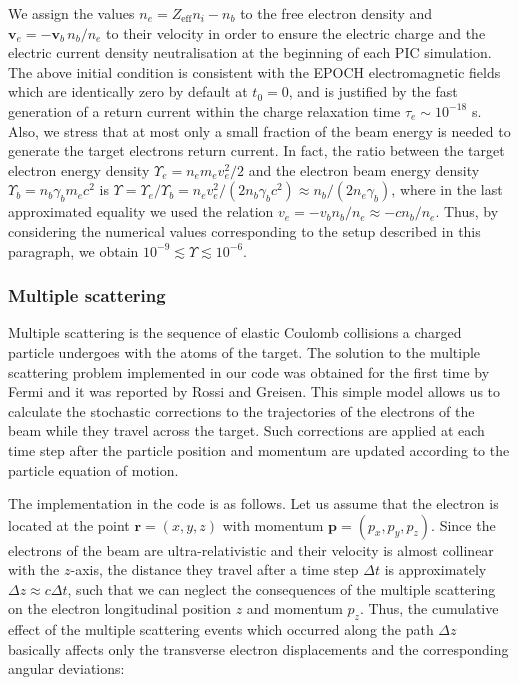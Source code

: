 \documentclass[fleqn,11pt]{wlscirep}
\begin{document}
We assign the values $n_e=Z_\text{eff}n_i-n_b$ to the free electron density and $\boldsymbol{v}_e=-\boldsymbol{v}_b\,n_b/n_e$ to their velocity in order to ensure the electric charge and the electric current density neutralisation at the beginning of each PIC simulation.  
The above initial condition is consistent with the EPOCH electromagnetic fields which are identically zero by default at $t_0=0$, and is justified by the fast generation of a return current within the charge relaxation time\cite{MillerChargedBeams,2001PhPl....8.1441F} $\tau_e\sim10^{-18}$ s. 
Also, we stress that at most only a small fraction of the beam energy is needed to generate the target electrons return current. In fact, the ratio between the target electron energy density $\Upsilon_e=n_em_ev_e^2/2$ and the electron beam energy density $\Upsilon_b=n_b\gamma_bm_ec^2$ is $\Upsilon=\Upsilon_e/\Upsilon_b=n_ev_e^2/(2n_b\gamma_bc^2)\approx n_b/(2n_e\gamma_b)$, where in the last approximated equality we used the relation $v_e=-v_bn_b/n_e\approx-cn_b/n_e$. 
Thus, by considering the numerical values corresponding to the setup described in this paragraph, we obtain $10^{-9}\lesssim\Upsilon\lesssim10^{-6}$.

\subsubsection*{Multiple scattering}

Multiple scattering\cite{Moliere:1948zz,PhysRev.89.1256} is the sequence of elastic Coulomb collisions a charged particle undergoes with the atoms of the target. 
The solution to the multiple scattering problem implemented in our code was obtained for the first time by Fermi and it was reported by Rossi and Greisen\cite{RevModPhys.13.240}. 
This simple model allows us to calculate the stochastic corrections to the trajectories of the electrons of the beam while they travel across the target. 
Such corrections are applied at each time step after the particle position and momentum are updated according to the particle equation of motion. 

The implementation in the code is as follows. Let us assume that the electron is located at the point $\boldsymbol{r}=(x,y,z)$ with momentum $\boldsymbol{p}=(p_{x},p_{y},p_{z})$. Since the electrons of the beam are ultra-relativistic and their velocity is almost collinear with the $z$-axis, the distance they travel after a time step $\Delta t$ is approximately $\Delta z\approx c\Delta t$, such that we can neglect the consequences of the multiple scattering on the electron longitudinal position $z$ and momentum $p_z$. 
Thus, the cumulative effect of the multiple scattering events which occurred along the path $\Delta z$ basically affects only the transverse electron displacements and the corresponding angular deviations\cite{Olive:2016xmw}:
\end{document}
